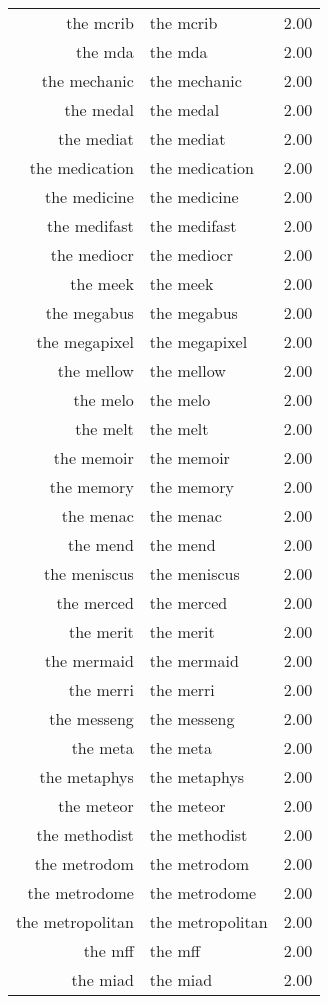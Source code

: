 \begin{table}[ht]
\begin{tabular}{rlr}
  the mcrib & the mcrib & 2.00 \\ 
  the mda & the mda & 2.00 \\ 
  the mechanic & the mechanic & 2.00 \\ 
  the medal & the medal & 2.00 \\ 
  the mediat & the mediat & 2.00 \\ 
  the medication & the medication & 2.00 \\ 
  the medicine & the medicine & 2.00 \\ 
  the medifast & the medifast & 2.00 \\ 
  the mediocr & the mediocr & 2.00 \\ 
  the meek & the meek & 2.00 \\ 
  the megabus & the megabus & 2.00 \\ 
  the megapixel & the megapixel & 2.00 \\ 
  the mellow & the mellow & 2.00 \\ 
  the melo & the melo & 2.00 \\ 
  the melt & the melt & 2.00 \\ 
  the memoir & the memoir & 2.00 \\ 
  the memory & the memory & 2.00 \\ 
  the menac & the menac & 2.00 \\ 
  the mend & the mend & 2.00 \\ 
  the meniscus & the meniscus & 2.00 \\ 
  the merced & the merced & 2.00 \\ 
  the merit & the merit & 2.00 \\ 
  the mermaid & the mermaid & 2.00 \\ 
  the merri & the merri & 2.00 \\ 
  the messeng & the messeng & 2.00 \\ 
  the meta & the meta & 2.00 \\ 
  the metaphys & the metaphys & 2.00 \\ 
  the meteor & the meteor & 2.00 \\ 
  the methodist & the methodist & 2.00 \\ 
  the metrodom & the metrodom & 2.00 \\ 
  the metrodome & the metrodome & 2.00 \\ 
  the metropolitan & the metropolitan & 2.00 \\ 
  the mff & the mff & 2.00 \\ 
  the miad & the miad & 2.00 \\ 

\end{tabular}
\end{table}
